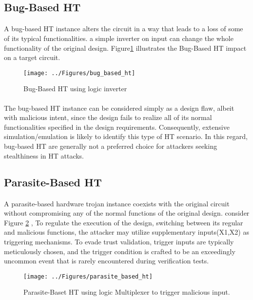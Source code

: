 \subsection*{Bug-Based HT}
\paragraph*{}
A bug-based HT instance alters the circuit in a way that leads to a loss of some of its typical functionalities. a simple inverter on input can change the whole functionality of the original design. Figure\ref{fig:bugbasedht} illustrates the Bug-Based HT impact on a target circuit.
\begin{figure}[h]
	\centering
	\texttt{[image: ../Figures/bug\_based\_ht]}
	\caption{Bug-Based HT using logic inverter}
	\label{fig:bugbasedht}
\end{figure}
\pagebreak
\paragraph*{}
The bug-based HT instance can be considered simply as a design flaw, albeit with malicious intent, since the design fails to realize all of its normal functionalities specified in the design requirements. Consequently, extensive simulation/emulation is likely to identify this type of HT scenario. In this regard, bug-based HT are generally not a preferred choice for attackers seeking stealthiness in HT attacks.
\subsection*{Parasite-Based HT}
\paragraph*{}
A parasite-based hardware trojan instance coexists with the original circuit without compromising any of the normal functions of the original design. consider Figure \ref{fig:parasitebasedht} , To regulate the execution of the design, switching between its regular and malicious functions, the attacker may utilize supplementary inputs(X1,X2) as triggering mechanisms. To evade trust validation, trigger inputs are typically meticulously chosen, and the trigger condition is crafted to be an exceedingly uncommon event that is rarely encountered during verification tests.
\begin{figure}[h]
	\centering
	\texttt{[image: ../Figures/parasite\_based\_ht]}
	\caption{Parasite-Baset HT using logic Multiplexer to trigger malicious input.}
	\label{fig:parasitebasedht}
\end{figure}

